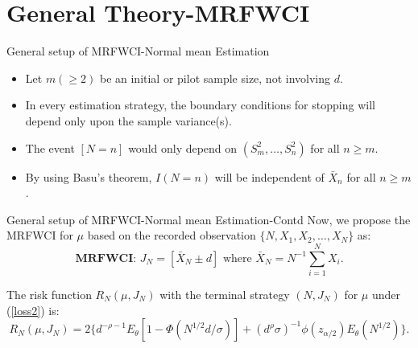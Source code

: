 \documentclass [xcolor=svgnames, t] {beamer}
\begin{document}
\section{General Theory-MRFWCI}
\begin{frame}{General setup of MRFWCI-Normal mean Estimation}
\vspace{5mm}
\begin{itemize}
\item Let $m(\geq 2)$ be an initial or pilot sample size, not involving $d$.
\item In every estimation strategy, the boundary 
conditions for stopping will depend only upon the sample variance(s).
\item The event $[N=n]$  would only depend on $(S_m^2,\dots,S_n^2)$ for all $n \geq m$.
\item By using Basu's theorem, $I(N=n)$ will be independent of $\bar{X}_n$ for all $n \geq m$.
\end{itemize}

\end{frame}

\begin{frame}{General setup of MRFWCI-Normal mean Estimation-Contd}
\vspace{5mm}
Now, we propose the MRFWCI for $\mu$ based on the recorded observation $\{N,X_1,X_2,\dots ,X_N\}$ as:
    \begin{equation*}
    \textbf{MRFWCI: }J_N=[\bar{X}_N \pm d] \text{ where }\bar{X}_N=N^{-1} \sum_{i=1}^N{X_i}.    
    \end{equation*}
    
    The risk function $R_N(\mu,J_N)$ with the terminal strategy $(N,J_N)$ for $\mu$ under (\ref{loss2}) is:
    \begin{equation*}
        R_N(\mu,J_N) = 2\{ d^{-\rho-1} E_{\theta}[1-\Phi(N^{1/2}d/\sigma)]+ (d^{\rho}\sigma)^{-1}\phi(z_{\alpha/2})E_{\theta}(N^{1/2})\}.
    \end{equation*}
    
    
\end{frame}

\end{document}
